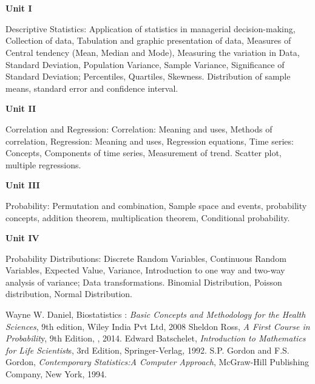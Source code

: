 \section{\courseinfo}

\textbf{Unit I}

Descriptive Statistics: Application of statistics in managerial decision-making, Collection of data, Tabulation and graphic presentation of data, Measures of Central tendency (Mean, Median and Mode), Measuring the variation in Data, Standard Deviation, Population Variance, Sample Variance, Significance of Standard Deviation; Percentiles, Quartiles, Skewness. Distribution of sample means, standard error and confidence interval.

\textbf{Unit II }

Correlation and Regression: Correlation: Meaning and uses, Methods of correlation, Regression: Meaning and uses, Regression equations, Time series: Concepts, Components of time series, Measurement of trend. Scatter plot, multiple regressions.

\textbf{Unit III}

Probability: Permutation and combination, Sample space and events, probability concepts, addition theorem, multiplication theorem, Conditional probability.


\textbf{Unit IV}

Probability Distributions: Discrete Random Variables, Continuous Random Variables, Expected Value, Variance, Introduction to one way and two-way analysis of variance; Data transformations. Binomial Distribution, Poisson distribution, Normal Distribution.


\begin{thebibliography}{99}
             Wayne W. Daniel, Biostatistics : \emph{Basic Concepts and Methodology for the Health Sciences}, 9th edition, Wiley India Pvt Ltd, 2008             Sheldon Ross, \emph{A First Course in Probabilit}y, 9th Edition,
, 2014.
             Edward Batschelet,  \emph{Introduction to Mathematics for Life Scientist}s, 3rd Edition, Springer-Verlag, 1992.
 S.P. Gordon and F.S. Gordon, \emph{Contemporary Statistics:A Computer Approach}, McGraw-Hill Publishing Company, New York, 1994. 
           
\end{thebibliography}
